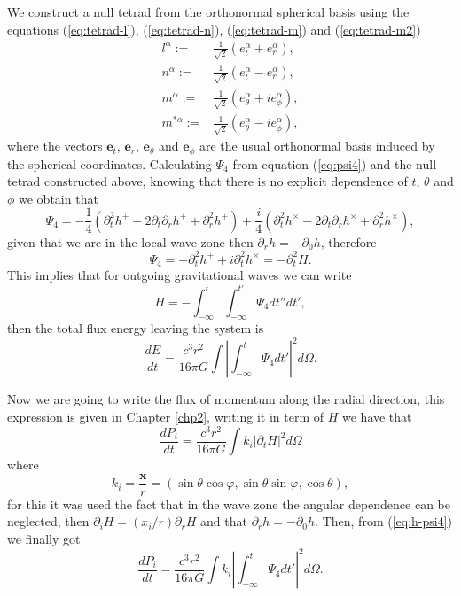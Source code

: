 We construct a null tetrad from the orthonormal spherical basis using
the equations (\ref{eq:tetrad-l}), (\ref{eq:tetrad-n}), (\ref{eq:tetrad-m})
and (\ref{eq:tetrad-m2})
\begin{align*}
l^{\alpha}:= & \frac{1}{\sqrt{2}}\left(e_{t}^{\alpha}+e_{r}^{\alpha}\right),\\
n^{\alpha}:= & \frac{1}{\sqrt{2}}\left(e_{t}^{\alpha}-e_{r}^{\alpha}\right),\\
m^{\alpha}:= & \frac{1}{\sqrt{2}}\left(e_{\theta}^{\alpha}+ie_{\phi}^{\alpha}\right),\\
m^{*\alpha}:= & \frac{1}{\sqrt{2}}\left(e_{\theta}^{\alpha}-ie_{\phi}^{\alpha}\right),
\end{align*}
where the vectors $\boldsymbol{e}_{t}$, $\boldsymbol{e}_{r}$,
$\boldsymbol{e}_{\theta}$ and $\boldsymbol{e}_{\phi}$ are the
usual orthonormal basis induced by the spherical coordinates. Calculating
$\Psi_{4}$ from equation (\ref{eq:psi4}) and the null tetrad constructed
above, knowing that there is no explicit dependence of $t$, $\theta$
and $\phi$ we obtain that
\[
\Psi_{4}=-\frac{1}{4}\left(\partial_{t}^{2}h^{+}-2\partial_{t}\partial_{r}h^{+}+\partial_{r}^{2}h^{+}\right)+\frac{i}{4}\left(\partial_{t}^{2}h^{\times}-2\partial_{t}\partial_{r}h^{\times}+\partial_{r}^{2}h^{\times}\right),
\]
given that we are in the local wave zone then $\partial_{r}h=-\partial_{0}h$,
therefore
\[
\Psi_{4}=-\partial_{t}^{2}h^{+}+i\partial_{t}^{2}h^{\times}=-\partial_{t}^{2}H.
\]
This implies that for outgoing gravitational waves we can write
\begin{equation}
H=-\int_{-\infty}^{t}\int_{-\infty}^{t'}\Psi_{4}dt''dt',\label{eq:h-psi4}
\end{equation}
then the total flux energy leaving the system is
\[
\frac{dE}{dt}=\frac{c^{3}r^{2}}{16\pi G}\int\left|\int_{-\infty}^{t}\Psi_{4}dt'\right|^{2}d\Omega.
\]

Now we are going to write the flux of momentum along the radial direction,
this expression is given in Chapter \ref{chp2}, writing it in term of $H$ we
have that
\[
\frac{dP_{i}}{dt}=\frac{c^{3}r^{2}}{16\pi G}\int k_i\left|\partial_{t}H\right|^{2}d\Omega
\]
where
\[
k_i=\frac{\boldsymbol{x}}{r}=\left(\sin\theta\cos\varphi,\sin\theta\sin\varphi,\cos\theta\right),
\]
for this it was used the fact that in the wave zone the angular dependence can be neglected, then $\partial_iH=\left(x_i/r\right)\partial_rH$ and that $\partial_{r}h=-\partial_{0}h$. Then, from (\ref{eq:h-psi4}) we finally got
\[
\frac{dP_{i}}{dt}=\frac{c^{3}r^{2}}{16\pi G}\int k_i\left|\int_{-\infty}^{t}\Psi_{4}dt'\right|^{2}d\Omega.
\]

